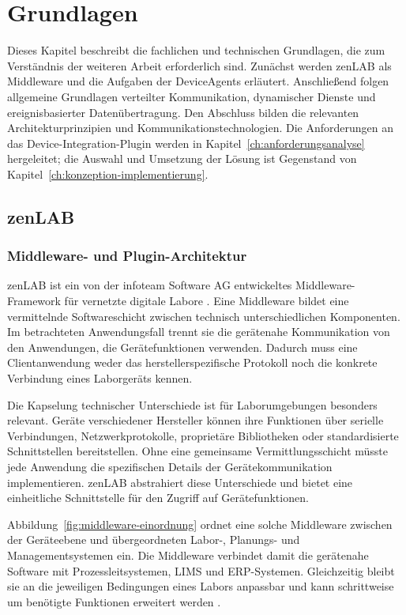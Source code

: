 \chapter{Grundlagen}\label{ch:grundlagen}

Dieses Kapitel beschreibt die fachlichen und technischen Grundlagen, die zum Verständnis der weiteren Arbeit erforderlich sind. Zunächst werden zenLAB als Middleware und die Aufgaben der DeviceAgents erläutert. Anschließend folgen allgemeine Grundlagen verteilter Kommunikation, dynamischer Dienste und ereignisbasierter Datenübertragung. Den Abschluss bilden die relevanten Architekturprinzipien und Kommunikationstechnologien. Die Anforderungen an das Device-Integration-Plugin werden in Kapitel~\ref{ch:anforderungsanalyse} hergeleitet; die Auswahl und Umsetzung der Lösung ist Gegenstand von Kapitel~\ref{ch:konzeption-implementierung}.

\section{zenLAB}

\subsection{Middleware- und Plugin-Architektur}

zenLAB ist ein von der infoteam Software AG entwickeltes Middleware-Framework für vernetzte digitale Labore \cite{infoteamLifeScience}. Eine Middleware bildet eine vermittelnde Softwareschicht zwischen technisch unterschiedlichen Komponenten. Im betrachteten Anwendungsfall trennt sie die gerätenahe Kommunikation von den Anwendungen, die Gerätefunktionen verwenden. Dadurch muss eine Clientanwendung weder das herstellerspezifische Protokoll noch die konkrete Verbindung eines Laborgeräts kennen.

Die Kapselung technischer Unterschiede ist für Laborumgebungen besonders relevant. Geräte verschiedener Hersteller können ihre Funktionen über serielle Verbindungen, Netzwerkprotokolle, proprietäre Bibliotheken oder standardisierte Schnittstellen bereitstellen. Ohne eine gemeinsame Vermittlungsschicht müsste jede Anwendung die spezifischen Details der Gerätekommunikation implementieren. zenLAB abstrahiert diese Unterschiede und bietet eine einheitliche Schnittstelle für den Zugriff auf Gerätefunktionen.

Abbildung~\ref{fig:middleware-einordnung} ordnet eine solche Middleware zwischen der Geräteebene und übergeordneten Labor-, Planungs- und Managementsystemen ein. Die Middleware verbindet damit die gerätenahe Software mit Prozessleitsystemen, LIMS und ERP-Systemen. Gleichzeitig bleibt sie an die jeweiligen Bedingungen eines Labors anpassbar und kann schrittweise um benötigte Funktionen erweitert werden \cite{infoteamZenLabWhitepaper}.

